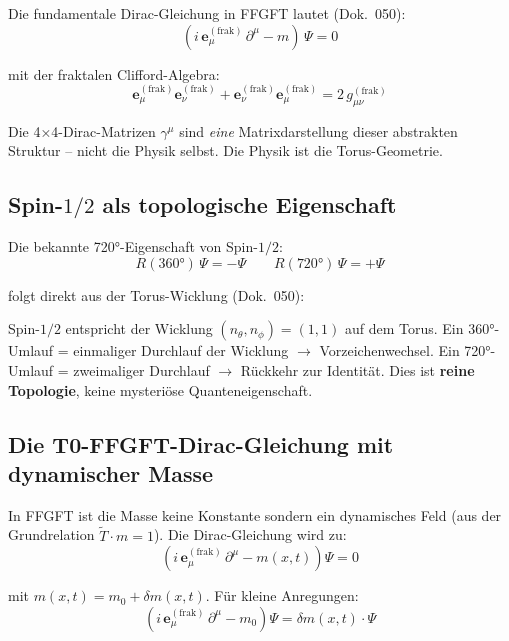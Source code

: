 Die fundamentale Dirac-Gleichung in FFGFT lautet (Dok.~050):
\begin{equation}
    (i\,\mathbf{e}_\mu^{(\mathrm{frak})}\,\partial^\mu - m)\,\Psi = 0
\end{equation}

mit der fraktalen Clifford-Algebra:
\begin{equation}
    \mathbf{e}_\mu^{(\mathrm{frak})} \mathbf{e}_\nu^{(\mathrm{frak})}
    + \mathbf{e}_\nu^{(\mathrm{frak})} \mathbf{e}_\mu^{(\mathrm{frak})}
    = 2\,g_{\mu\nu}^{(\mathrm{frak})}
\end{equation}

Die 4×4-Dirac-Matrizen $\gamma^\mu$ sind \emph{eine} Matrixdarstellung
dieser abstrakten Struktur -- nicht die Physik selbst. Die Physik
ist die Torus-Geometrie.

\subsection{Spin-$1/2$ als topologische Eigenschaft}

Die bekannte 720°-Eigenschaft von Spin-$1/2$:
\begin{equation}
    R(360°)\,\Psi = -\Psi \qquad R(720°)\,\Psi = +\Psi
\end{equation}

folgt direkt aus der Torus-Wicklung (Dok.~050):

\begin{keybox}
Spin-$1/2$ entspricht der Wicklung $(n_\theta, n_\phi) = (1,1)$ auf
dem Torus. Ein 360°-Umlauf = einmaliger Durchlauf der Wicklung $\to$
Vorzeichenwechsel. Ein 720°-Umlauf = zweimaliger Durchlauf $\to$
Rückkehr zur Identität. Dies ist \textbf{reine Topologie}, keine
mysteriöse Quanteneigenschaft.
\end{keybox}

\subsection{Die T0-FFGFT-Dirac-Gleichung mit dynamischer Masse}

In FFGFT ist die Masse keine Konstante sondern ein dynamisches Feld
(aus der Grundrelation $\tilde{T}\cdot m = 1$). Die Dirac-Gleichung
wird zu:
\begin{equation}
    \left(i\,\mathbf{e}_\mu^{(\mathrm{frak})}\,\partial^\mu
    - m(x,t)\right)\Psi = 0
\end{equation}

mit $m(x,t) = m_0 + \delta m(x,t)$. Für kleine Anregungen:
\begin{equation}
    \left(i\,\mathbf{e}_\mu^{(\mathrm{frak})}\,\partial^\mu - m_0\right)\Psi
    = \delta m(x,t)\cdot\Psi
\end{equation}

